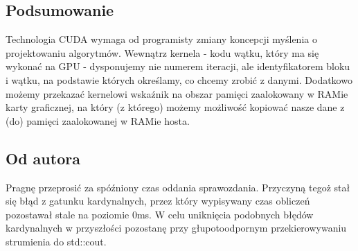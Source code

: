 \documentclass[a4paper,12pt]{article}
\begin{document}
\subsection*{Podsumowanie}

Technologia CUDA wymaga od programisty zmiany koncepcji myślenia o projektowaniu algorytmów. Wewnątrz kernela - kodu wątku, który ma się wykonać na GPU - dysponujemy nie numerem iteracji, ale identyfikatorem bloku i wątku, na podstawie których określamy, co chcemy zrobić z danymi. Dodatkowo możemy przekazać kernelowi wskaźnik na obszar pamięci zaalokowany w RAMie karty graficznej, na który (z którego) możemy możliwość kopiować nasze dane z (do) pamięci zaalokowanej w RAMie hosta.

\subsection*{Od autora}

Pragnę przeprosić za spóźniony czas oddania sprawozdania. Przyczyną tegoż stał się błąd z gatunku kardynalnych, przez który wypisywany czas obliczeń pozostawał stale na poziomie 0ms. W celu uniknięcia podobnych błędów kardynalnych w przyszłości pozostanę przy głupotoodpornym przekierowywaniu strumienia do std::cout.
\end{document}
